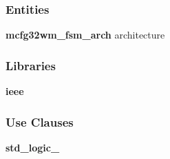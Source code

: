 \subsubsection*{Entities}
\begin{DoxyCompactItemize}
\item 
{\bf mcfg32wm\+\_\+fsm\+\_\+arch} architecture
\end{DoxyCompactItemize}
\subsubsection*{Libraries}
 \begin{DoxyCompactItemize}
\item 
{\bf ieee} 
\end{DoxyCompactItemize}
\subsubsection*{Use Clauses}
 \begin{DoxyCompactItemize}
\item 
{\bf std\+\_\+logic\+\_}   
\end{DoxyCompactItemize}
